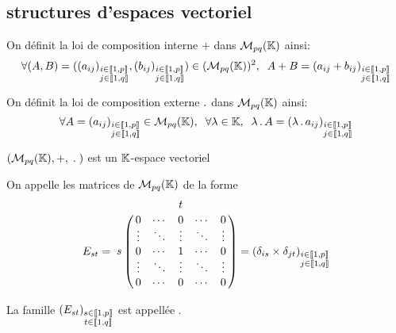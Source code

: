 \subsection{structures d'espaces vectoriel}

\begin{dfn}
On définit la loi de composition interne $+$ dans $\operatorname{\mathcal{M}}_{pq}(\mathbb{K})$ ainsi:
\[
    \forall (A, B) = 
        ((a_{ij})_{\substack{ i \in \llbracket 1, p \rrbracket \\ j \in \llbracket 1, q \rrbracket}},
        (b_{ij})_{\substack{ i \in \llbracket 1, p \rrbracket \\ j \in \llbracket 1, q \rrbracket}})
        \in (\operatorname{\mathcal{M}}_{pq}(\mathbb{K}))^2, \;\;
    A + B = (a_{ij} + b_{ij})_{\substack{ i \in \llbracket 1, p \rrbracket \\
        j \in \llbracket 1, q \rrbracket}}
\]

On définit la loi de composition externe $\operatorname{.}$ dans $\operatorname{\mathcal{M}}_{pq}(\mathbb{K})$ ainsi:
\[
    \forall A =
        (a_{ij})_{\substack {i \in \llbracket 1, p \rrbracket \\ j \in \llbracket 1, q \rrbracket}}
        \in \operatorname{\mathcal{M}}_{pq}(\mathbb{K}), \;\;
    \forall \lambda \in \mathbb{K}, \;\;
    \lambda \operatorname{.} A = 
        (\lambda \operatorname{.} a_{ij})_{
            \substack {i \in \llbracket 1, p \rrbracket \\ j \in \llbracket 1, q \rrbracket}}
\]
\end{dfn}

\begin{prp}
$(\operatorname{\mathcal{M}}_{pq}(\mathbb{K}), +, \; \operatorname{.} \;)$ est un $\mathbb{K}$-espace vectoriel
\end{prp}

\begin{dfn}[Notation]
On appelle  les matrices de
$\operatorname{\mathcal{M}}_{pq}(\mathbb{K})$ de la forme
\[
    E_{st} = 
    \bordermatrix{
        ~ & ~       & ~         & t         & ~         & ~         \cr
        ~ & 0       & \cdots    & 0         & \cdots    & 0         \cr
        ~ & \vdots  & \ddots    & \vdots    & \ddots    & \vdots    \cr
        s & 0       & \cdots    & 1         & \cdots    & 0         \cr
        ~ & \vdots  & \ddots    & \vdots    & \ddots    & \vdots    \cr
        ~ & 0       & \cdots    & 0         & \cdots    & 0         \cr
    }
    = (\delta_{is} \times \delta_{jt})_{
        \substack {i \in \lib 1, p \rib \\ j \in \lib 1, q \rib}}
\]
\end{dfn}

\begin{prp}
La famille
$(E_{st})_{\substack {s \in \llbracket 1, p \rrbracket \\ t \in \llbracket 1, q \rrbracket}}$
est appellée .
\end{prp}

